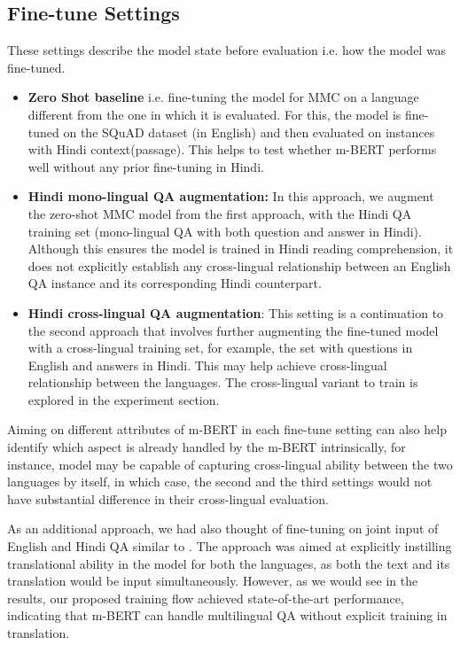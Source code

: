 \documentclass[acmsmall]{acmart}
\begin{document}
\subsection{Fine-tune Settings}
\label{finetune_settings}
\par These settings describe the model state before evaluation i.e. how the model was fine-tuned.
\begin{itemize}
    \item \textbf{Zero Shot baseline} i.e. fine-tuning the model for MMC on a language different from the one in which it is evaluated. For this, the model is fine-tuned on the SQuAD dataset \cite{squad} (in English) and then evaluated on instances with Hindi context(passage). This helps to test whether m-BERT performs well without any prior fine-tuning in Hindi. 
    
    \item \textbf{Hindi mono-lingual QA augmentation:} In this approach, we augment the zero-shot MMC model from the first approach, with the Hindi QA training set (mono-lingual QA with both question and answer in Hindi). Although this ensures the model is trained in Hindi reading comprehension, it does not explicitly establish any cross-lingual relationship between an English QA instance and its corresponding Hindi counterpart. 
    
    \item \textbf{Hindi cross-lingual QA augmentation}: This setting is a continuation to the second approach that involves further augmenting the fine-tuned model with a cross-lingual training set, for example, the set with questions in English and answers in Hindi. This may help achieve cross-lingual relationship between the languages. The cross-lingual variant to train is explored in the experiment section. 
\end{itemize}
\par Aiming on different attributes of m-BERT in each fine-tune setting can also help identify which aspect is already handled by the m-BERT intrinsically, for instance, model may be capable of capturing cross-lingual ability between the two languages by itself, in which case, the second and the third settings would not have substantial difference in their cross-lingual evaluation.
\par As an additional approach, we had also thought of fine-tuning on joint input of English and Hindi QA similar to \cite{latestMQA}. The approach was aimed at explicitly instilling translational ability in the model for both the languages, as both the text and its translation would be input simultaneously. However, as we would see in the results, our proposed training flow achieved state-of-the-art performance, indicating that m-BERT can handle multilingual QA without explicit training in translation. 
\end{document}

